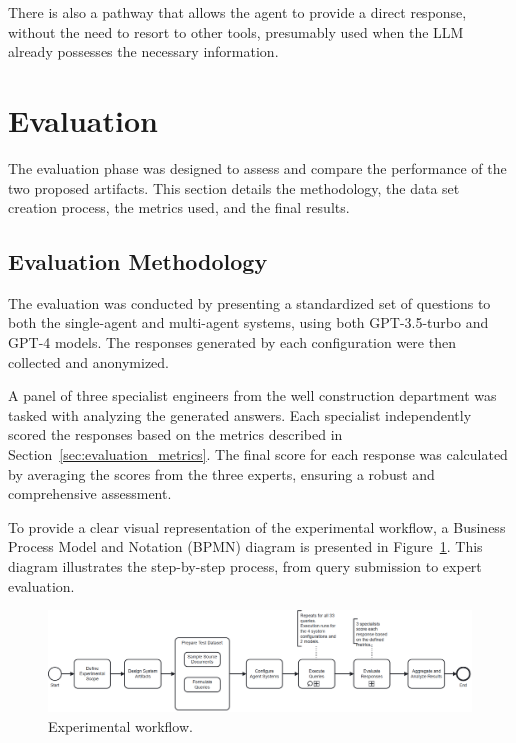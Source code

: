             There is also a pathway that allows the agent to provide a direct response, without the need to resort to other tools, presumably used when the LLM already possesses the necessary information.

    \section{Evaluation}

        The evaluation phase was designed to assess and compare the performance of the two proposed artifacts. This section details the methodology, the data set creation process, the metrics used, and the final results.

        \subsection{Evaluation Methodology}
        
            The evaluation was conducted by presenting a standardized set of questions to both the single-agent and multi-agent systems, using both GPT-3.5-turbo and GPT-4 models. The responses generated by each configuration were then collected and anonymized.

            A panel of three specialist engineers from the well construction department was tasked with analyzing the generated answers. Each specialist independently scored the responses based on the metrics described in Section~\ref{sec:evaluation_metrics}. The final score for each response was calculated by averaging the scores from the three experts, ensuring a robust and comprehensive assessment.
            

            To provide a clear visual representation of the experimental workflow, a Business Process Model and Notation (BPMN) diagram is presented in Figure~\ref{fig:experimental_workflow}. This diagram illustrates the step-by-step process, from query submission to expert evaluation.

            \begin{figure}[h]
                \centering
                \includegraphics[width=\textwidth]{images/bpmn_experimento_1.png}
                \caption{Experimental workflow.}
                \label{fig:experimental_workflow}
            \end{figure}

